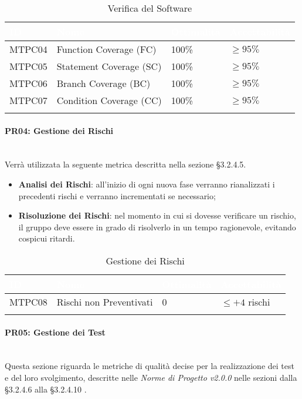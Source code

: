 \begin{longtable}{|C{.15\textwidth}|C{.24\textwidth}|C{.24\textwidth}|C{.24\textwidth}|}
\hline
{}\textbf{\textcolor{white}{ID}} & \textbf{\textcolor{white}{Nome}} & \textbf{\textcolor{white}{Ottimalità}} & \textbf{\textcolor{white}{Accettabilità}}\\
\hline \hline
\endfirsthead
MTPC04 & Function Coverage (FC) & 100\% & $\geqslant 95\%$ \\
\hline
{} MTPC05 & Statement Coverage (SC) & 100\% & $\geqslant 95\%$ \\
\hline
MTPC06 & Branch Coverage (BC) & 100\% & $\geqslant 95\%$ \\
\hline
{}MTPC07 & Condition Coverage (CC) & 100\% & $\geqslant 95\%$ \\
\hline
\caption{Verifica del Software}
\label{VerificaSoftware}
\end{longtable}

\paragraph{PR04: Gestione dei Rischi}\-\\
Verrà utilizzata la seguente metrica descritta nella sezione §3.2.4.5.
\begin{itemize}
	\item \textbf{Analisi dei Rischi}: all'inizio di ogni nuova fase verranno rianalizzati i precedenti rischi e verranno incrementati se necessario;
	\item \textbf{Risoluzione dei Rischi}: nel momento in cui si dovesse verificare un rischio, il gruppo deve essere in grado di risolverlo in un tempo ragionevole, evitando cospicui ritardi.
\end{itemize}

\begin{longtable}{|C{.15\textwidth}|C{.24\textwidth}|C{.24\textwidth}|C{.24\textwidth}|}
\hline
{}\textbf{\textcolor{white}{ID}} & \textbf{\textcolor{white}{Nome}} & \textbf{\textcolor{white}{Ottimalità}} & \textbf{\textcolor{white}{Accettabilità}}\\
\hline \hline
\endfirsthead
MTPC08 & Rischi non Preventivati & 0 & $ \leqslant +4$ rischi \\
\hline
\caption{Gestione dei Rischi}
\label{GestioneRischi}
\end{longtable}

\paragraph{PR05: Gestione dei Test}\-\\
Questa sezione riguarda le metriche di qualità decise per la realizzazione dei test e del loro svolgimento, descritte nelle \textit{Norme di Progetto v2.0.0} nelle sezioni dalla §3.2.4.6 alla §3.2.4.10 .

